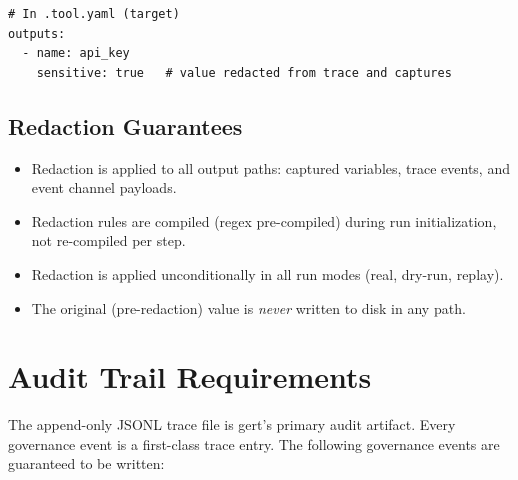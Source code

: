 \begin{verbatim}
# In .tool.yaml (target)
outputs:
  - name: api_key
    sensitive: true   # value redacted from trace and captures
\end{verbatim}

\subsection{Redaction Guarantees}

\begin{itemize}
  \item Redaction is applied to all output paths: captured variables, trace events, and
        event channel payloads.
  \item Redaction rules are compiled (regex pre-compiled) during run initialization, not
        re-compiled per step.
  \item Redaction is applied unconditionally in all run modes (real, dry-run, replay).
  \item The original (pre-redaction) value is \emph{never} written to disk in any path.
\end{itemize}

\section{Audit Trail Requirements}

The append-only JSONL trace file is gert's primary audit artifact. Every governance event
is a first-class trace entry. The following governance events are guaranteed to be written:

